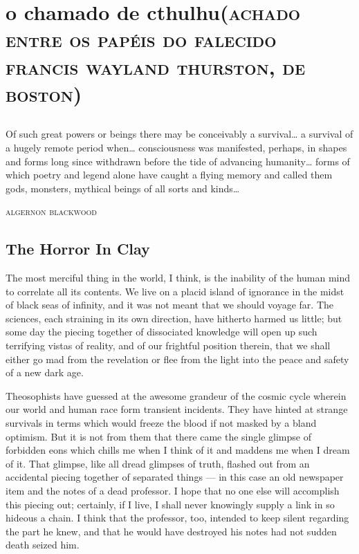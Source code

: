\blankpage
\openany

\part[o chamado de cthulhu]{o chamado de cthulhu\break\normalsize\textsc{(achado entre os papéis do falecido\\ francis wayland thurston, de boston)}}

\begin{pages}
    \begin{Leftside}
        \beginnumbering
            \pstart

\chapter*{}

\epigraph{Of such great powers or beings there may be conceivably a
survival\ldots{} a survival of a hugely remote period when\ldots{}
consciousness was manifested, perhaps, in shapes and forms long since
withdrawn before the tide of advancing humanity\ldots{} forms of which
poetry and legend alone have caught a flying memory and called them
gods, monsters, mythical beings of all sorts and kinds\ldots{}}{\textsc{algernon blackwood}}


\chapter*{The Horror In Clay}

\noindent{}The most merciful thing in the world, I think, is the inability of the
human mind to correlate all its contents. We live on a placid island of
ignorance in the midst of black seas of infinity, and it was not meant
that we should voyage far. The sciences, each straining in its own
direction, have hitherto harmed us little; but some day the piecing
together of dissociated knowledge will open up such terrifying vistas of
reality, and of our frightful position therein, that we shall either go
mad from the revelation or flee from the light into the peace and safety
of a new dark age.


Theosophists have guessed at the awesome grandeur of the cosmic cycle
wherein our world and human race form transient incidents. They have
hinted at strange survivals in terms which would freeze the blood if not
masked by a bland optimism. But it is not from them that there came the
single glimpse of forbidden eons which chills me when I think of it and
maddens me when I dream of it. That glimpse, like all dread glimpses of
truth, flashed out from an accidental piecing together of separated
things --- in this case an old newspaper item and the notes of a dead
professor. I hope that no one else will accomplish this piecing out;
certainly, if I live, I shall never knowingly supply a link in so
hideous a chain. I think that the professor, too, intended to keep
silent regarding the part he knew, and that he would have destroyed his
notes had not sudden death seized him.


\end{Leftside}
\end{pages}

